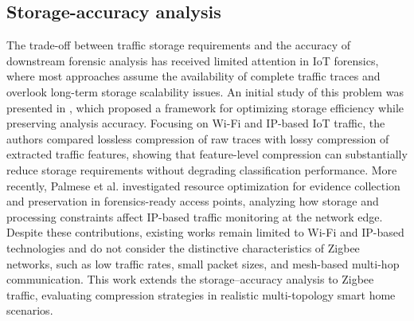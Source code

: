 \subsection{Storage-accuracy analysis}
The trade-off between traffic storage requirements and the accuracy of downstream forensic analysis has received limited attention in IoT forensics, where most approaches assume the availability of complete traffic traces and overlook long-term storage scalability issues.
An initial study of this problem was presented in \cite{fabio2,fabio3}, which proposed a framework for optimizing storage efficiency while preserving analysis accuracy. Focusing on Wi-Fi and IP-based IoT traffic, the authors compared lossless compression of raw traces with lossy compression of extracted traffic features, showing that feature-level compression can substantially reduce storage requirements without degrading classification performance.
More recently, Palmese et al. \cite{palmese2025resource} investigated resource optimization for evidence collection and preservation in forensics-ready access points, analyzing how storage and processing constraints affect IP-based traffic monitoring at the network edge.
Despite these contributions, existing works remain limited to Wi-Fi and IP-based technologies and do not consider the distinctive characteristics of Zigbee networks, such as low traffic rates, small packet sizes, and mesh-based multi-hop communication. This work extends the storage--accuracy analysis to Zigbee traffic, evaluating compression strategies in realistic multi-topology smart home scenarios.